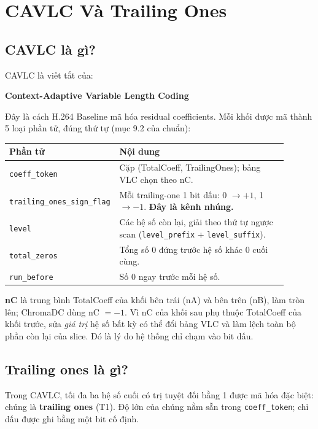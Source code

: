\documentclass[11pt,a4paper]{article}
\begin{document}
\section{CAVLC Và Trailing Ones}

\subsection{CAVLC là gì?}

CAVLC là viết tắt của:

\begin{center}
\textbf{Context-Adaptive Variable Length Coding}
\end{center}

Đây là cách H.264 Baseline mã hóa residual coefficients. Mỗi khối được mã thành
5 loại phần tử, đúng thứ tự (mục 9.2 của chuẩn):

\begin{center}
\begin{tabular}{p{0.30\linewidth}p{0.60\linewidth}}
\toprule
Phần tử & Nội dung \\
\midrule
\texttt{coeff\_token} & Cặp (TotalCoeff, TrailingOnes); bảng VLC chọn theo nC. \\
\texttt{trailing\_ones\_sign\_flag} & Mỗi trailing-one 1 bit dấu: 0 \(\rightarrow +1\), 1 \(\rightarrow -1\). \textbf{Đây là kênh nhúng.} \\
\texttt{level} & Các hệ số còn lại, giải theo thứ tự ngược scan (\texttt{level\_prefix} + \texttt{level\_suffix}). \\
\texttt{total\_zeros} & Tổng số 0 đứng trước hệ số khác 0 cuối cùng. \\
\texttt{run\_before} & Số 0 ngay trước mỗi hệ số. \\
\bottomrule
\end{tabular}
\end{center}

\textbf{nC} là trung bình TotalCoeff của khối bên trái (nA) và bên trên (nB), làm
tròn lên; ChromaDC dùng nC \(= -1\). Vì nC của khối sau phụ thuộc TotalCoeff của
khối trước, sửa \emph{giá trị} hệ số bất kỳ có thể đổi bảng VLC và làm lệch toàn
bộ phần còn lại của slice. Đó là lý do hệ thống chỉ chạm vào bit dấu.

\subsection{Trailing ones là gì?}

Trong CAVLC, tối đa ba hệ số cuối có trị tuyệt đối bằng 1 được mã hóa đặc biệt:
chúng là \textbf{trailing ones} (T1). Độ lớn của chúng nằm sẵn trong
\texttt{coeff\_token}; chỉ dấu được ghi bằng một bit cố định.
\end{document}
